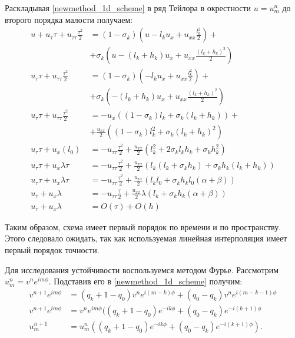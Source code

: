 Раскладывая \ref{newmethod_1d_scheme} в ряд Тейлора в окрестности $u = u_m^n$ до второго порядка малости получаем:
\begin{align}
u + u_\tau \tau + u_{\tau\tau} \frac{\tau^2}{2} &= (1 - \sigma_k) (u - l_k u_x + u_{xx} \frac{l_k^2}{2}) + \nonumber\\
	&+ \sigma_k (u - (l_k+h_k) u_x + u_{xx} \frac{(l_k+h_k)^2}{2}) \nonumber\\
u_\tau \tau + u_{\tau\tau} \frac{\tau^2}{2} &= (1 - \sigma_k) (- l_k u_x + u_{xx} \frac{l_k^2}{2}) + \nonumber\\
	&+ \sigma_k (- (l_k+h_k) u_x + u_{xx} \frac{(l_k+h_k)^2}{2}) \nonumber\\
u_\tau \tau + u_{\tau\tau} \frac{\tau^2}{2} &= - u_x ( (1 - \sigma_k) l_k + \sigma_k (l_k+h_k) ) + \nonumber\\
	&+\frac{u_{xx}}{2} ( (1 - \sigma_k) l_k^2 + \sigma_k (l_k+h_k)^2 ) \nonumber\\
u_\tau \tau + u_x  ( l_0 ) &= - u_{\tau\tau} \frac{\tau^2}{2} + \frac{u_{xx}}{2} ( l_k^2 + 2 \sigma_k l_k h_k + \sigma_k h_k^2 ) \nonumber\\
u_\tau \tau + u_x  \lambda \tau &= - u_{\tau\tau} \frac{\tau^2}{2} + \frac{u_{xx}}{2} ( l_k (l_k + \sigma_k h_k) + \sigma_k h_k (l_k + h_k) ) \nonumber\\
u_\tau \tau + u_x  \lambda \tau &= - u_{\tau\tau} \frac{\tau^2}{2} + \frac{u_{xx}}{2} ( l_k l_0  + \sigma_k h_k l_0 (\alpha + \beta) ) \nonumber\\
u_\tau + u_x  \lambda &= - u_{\tau\tau} \frac{\tau}{2} + \frac{u_{xx}}{2} \lambda ( l_k  + \sigma_k h_k (\alpha + \beta) ) \nonumber\\
u_\tau + u_x  \lambda &= O(\tau) + O (h)
\end{align}

Таким образом, схема имеет первый порядок по времени и по пространству. Этого следовало ожидать, так как используемая линейная интерполяция имеет первый порядок точности.

Для исследования устойчивости воспользуемся методом Фурье. Рассмотрим $u_m^n = v^n e^{im\phi}$. Подставив его в \ref{newmethod_1d_scheme} получим:
\begin{align}
v^{n+1} e^{im\phi} &= (q_k + 1 - q_0) v^{n} e^{i(m-k)\phi} + (q_0 - q_k) v^{n} e^{i(m-k-1)\phi} \nonumber\\
v^{n+1} e^{im\phi} &= v^{n} e^{im\phi} ((q_k + 1 - q_0) e^{-ik\phi} + (q_0 - q_k) e^{-i(k+1)\phi} \nonumber\\
u_m^{n+1} &= u_m^n ((q_k + 1 - q_0) e^{-ik\phi} + (q_0 - q_k) e^{-i(k+1)\phi}).
\end{align}

